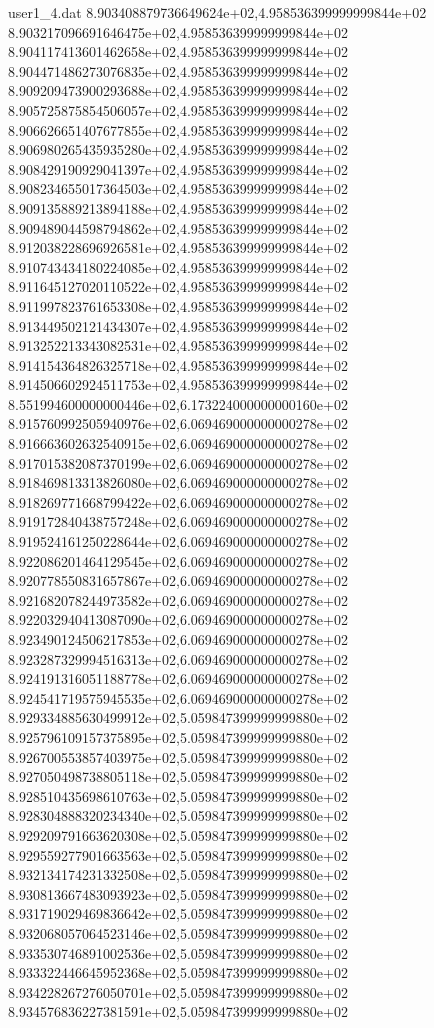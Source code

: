 \begin{filecontents}{user1_4.dat}
8.903408879736649624e+02,4.958536399999999844e+02
8.903217096691646475e+02,4.958536399999999844e+02
8.904117413601462658e+02,4.958536399999999844e+02
8.904471486273076835e+02,4.958536399999999844e+02
8.909209473900293688e+02,4.958536399999999844e+02
8.905725875854506057e+02,4.958536399999999844e+02
8.906626651407677855e+02,4.958536399999999844e+02
8.906980265435935280e+02,4.958536399999999844e+02
8.908429190929041397e+02,4.958536399999999844e+02
8.908234655017364503e+02,4.958536399999999844e+02
8.909135889213894188e+02,4.958536399999999844e+02
8.909489044598794862e+02,4.958536399999999844e+02
8.912038228696926581e+02,4.958536399999999844e+02
8.910743434180224085e+02,4.958536399999999844e+02
8.911645127020110522e+02,4.958536399999999844e+02
8.911997823761653308e+02,4.958536399999999844e+02
8.913449502121434307e+02,4.958536399999999844e+02
8.913252213343082531e+02,4.958536399999999844e+02
8.914154364826325718e+02,4.958536399999999844e+02
8.914506602924511753e+02,4.958536399999999844e+02
8.551994600000000446e+02,6.173224000000000160e+02
8.915760992505940976e+02,6.069469000000000278e+02
8.916663602632540915e+02,6.069469000000000278e+02
8.917015382087370199e+02,6.069469000000000278e+02
8.918469813313826080e+02,6.069469000000000278e+02
8.918269771668799422e+02,6.069469000000000278e+02
8.919172840438757248e+02,6.069469000000000278e+02
8.919524161250228644e+02,6.069469000000000278e+02
8.922086201464129545e+02,6.069469000000000278e+02
8.920778550831657867e+02,6.069469000000000278e+02
8.921682078244973582e+02,6.069469000000000278e+02
8.922032940413087090e+02,6.069469000000000278e+02
8.923490124506217853e+02,6.069469000000000278e+02
8.923287329994516313e+02,6.069469000000000278e+02
8.924191316051188778e+02,6.069469000000000278e+02
8.924541719575945535e+02,6.069469000000000278e+02
8.929334885630499912e+02,5.059847399999999880e+02
8.925796109157375895e+02,5.059847399999999880e+02
8.926700553857403975e+02,5.059847399999999880e+02
8.927050498738805118e+02,5.059847399999999880e+02
8.928510435698610763e+02,5.059847399999999880e+02
8.928304888320234340e+02,5.059847399999999880e+02
8.929209791663620308e+02,5.059847399999999880e+02
8.929559277901663563e+02,5.059847399999999880e+02
8.932134174231332508e+02,5.059847399999999880e+02
8.930813667483093923e+02,5.059847399999999880e+02
8.931719029469836642e+02,5.059847399999999880e+02
8.932068057064523146e+02,5.059847399999999880e+02
8.933530746891002536e+02,5.059847399999999880e+02
8.933322446645952368e+02,5.059847399999999880e+02
8.934228267276050701e+02,5.059847399999999880e+02
8.934576836227381591e+02,5.059847399999999880e+02

\end{filecontents}
